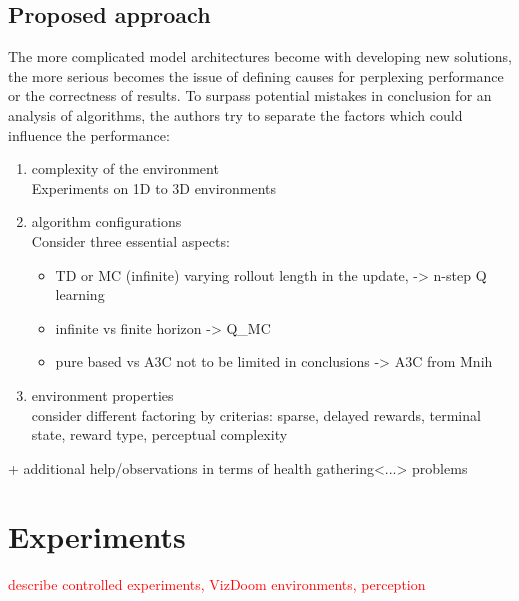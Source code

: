 \documentclass{article}
\begin{document}
\subsection{Proposed approach}
\color{red}
The more complicated model architectures become with developing
new solutions, the more serious becomes the issue of defining causes
for perplexing performance
or the correctness of results.
To surpass potential mistakes in conclusion for an analysis of algorithms,
the authors try to separate the factors which could influence
the performance:
\begin{enumerate}
\item complexity of the environment  \\
Experiments on 1D to 3D environments
\item algorithm configurations \\
Consider three essential aspects:
\begin{itemize}
  \item TD or MC (infinite) varying rollout length in the
  update, -> n-step Q learning
  \item infinite vs finite horizon -> Q\_MC
  \item pure based vs A3C not to be limited in conclusions -> A3C from Mnih
\end{itemize}
\item environment properties \\
consider different factoring by criterias: sparse, delayed rewards, terminal
state, reward type, perceptual complexity
\end{enumerate}

+ additional help/observations in terms of health gathering<...> problems

\color{black}

\section{Experiments}


 \textcolor{red}{describe controlled experiments, VizDoom environments, perception}

\end{document}
